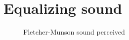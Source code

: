 \section{Equalizing sound}

\begin{figure}[H]
\centering
{}

\caption{Fletcher-Munson sound perceived }
\label{fig:SoundPerceived}
\end{figure}
